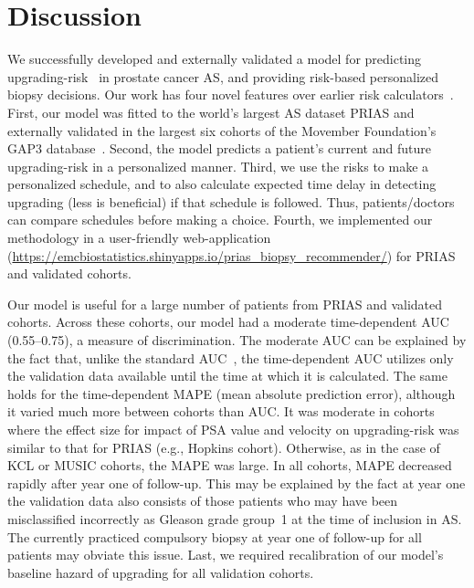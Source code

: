 \section{Discussion}
We successfully developed and externally validated a model for predicting upgrading-risk~\citep{bruinsma2017expert} in prostate cancer AS, and providing risk-based personalized biopsy decisions. Our work has four novel features over earlier risk calculators~\citep{coley2017prediction,ankerst2015precision}. First, our model was fitted to the world's largest AS dataset PRIAS and externally validated in the largest six cohorts of the Movember Foundation's GAP3 database~\citep{gap3_2018}. Second, the model predicts a patient's current and future upgrading-risk in a personalized manner. Third, we use the risks to make a personalized schedule, and to also calculate expected time delay in detecting upgrading (less is beneficial) if that schedule is followed. Thus, patients/doctors can compare schedules before making a choice. Fourth, we implemented our methodology in a user-friendly web-application (\url{https://emcbiostatistics.shinyapps.io/prias_biopsy_recommender/}) for PRIAS and validated cohorts.

Our model is useful for a large number of patients from PRIAS and validated cohorts. Across these cohorts, our model had a moderate time-dependent AUC (0.55--0.75), a measure of discrimination. The moderate AUC can be explained by the fact that, unlike the standard AUC~\citep{steyerberg2010assessing}, the time-dependent AUC utilizes only the validation data available until the time at which it is calculated. The same holds for the time-dependent MAPE (mean absolute prediction error), although it varied much more between cohorts than AUC. It was moderate in cohorts where the effect size for impact of PSA value and velocity on upgrading-risk was similar to that for PRIAS (e.g., Hopkins cohort). Otherwise, as in the case of KCL or MUSIC cohorts, the MAPE was large. In all cohorts, MAPE decreased rapidly after year one of follow-up. This may be explained by the fact at year one the validation data also consists of those patients who may have been misclassified incorrectly as Gleason grade group~1 at the time of inclusion in AS. The currently practiced compulsory biopsy at year one of follow-up for all patients may obviate this issue. Last, we required recalibration of our model's baseline hazard of upgrading for all validation cohorts.

